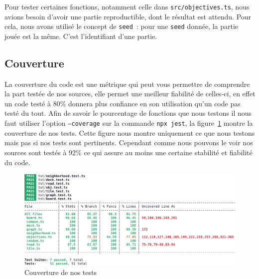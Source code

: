 Pour tester certaines fonctions, notamment celle dans \texttt{src/objectives.ts}, nous avions besoin d'avoir une partie reproductible, dont le résultat est attendu. Pour cela, nous avons utilisé le concept de \texttt{seed}~: pour une \texttt{seed} donnée, la partie jouée est la même. C'est l'identifiant d'une partie.

\subsection{Couverture}

La couverture du code est une métrique qui peut vous permettre de comprendre la part testée de nos sources, elle permet une meilleur fiabilité de celles-ci, en effet un code testé à 80\% donnera plus confiance en son utilisation qu'un code pas testé du tout. Afin de savoir le pourcentage de fonctions que nous testons il nous faut utiliser l'option \texttt{--coverage} sur la commande \texttt{npx jest}, la figure~\ref{fig:couverture} montre la couverture de nos tests.
Cette figure nous montre uniquement ce que nous testons mais pas si nos tests sont pertinents. Cependant comme nous pouvons le voir nos sources sont testés à 92\% ce qui assure au moins une certaine stabilité et fiabilité du code.

\begin{figure}[H]
    \centering
    \includegraphics[width=0.9\linewidth]{images/tests/couverture_test.png}
    \caption{Couverture de nos tests}
    \label{fig:couverture}
\end{figure}